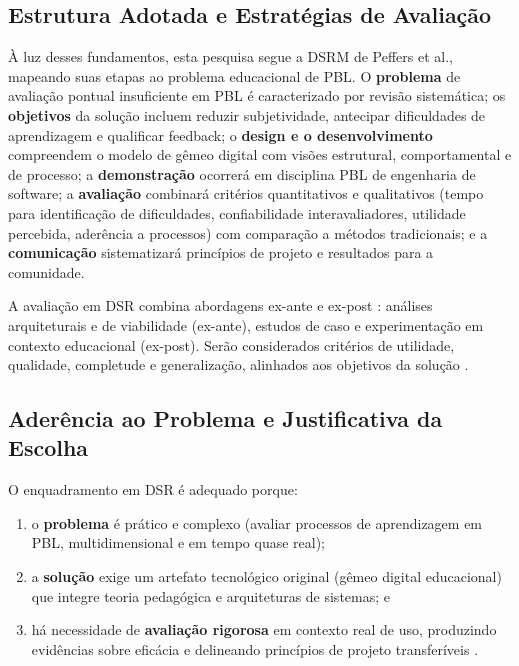 \documentclass[12pt,a4paper]{article}
\begin{document}
\subsection{Estrutura Adotada e Estratégias de Avaliação}

À luz desses fundamentos, esta pesquisa segue a DSRM de Peffers et
al., mapeando suas etapas ao problema educacional de PBL. O \textbf{problema} de
avaliação pontual insuficiente em PBL é caracterizado por revisão sistemática; os
\textbf{objetivos} da solução incluem reduzir subjetividade, antecipar dificuldades de
aprendizagem e qualificar feedback; o \textbf{design e o desenvolvimento} compreendem o
modelo de gêmeo digital com visões estrutural, comportamental e de processo; a
\textbf{demonstração} ocorrerá em disciplina PBL de engenharia de software; a
\textbf{avaliação} combinará critérios quantitativos e qualitativos (tempo para
identificação de dificuldades, confiabilidade interavaliadores, utilidade percebida,
aderência a processos) com comparação a métodos tradicionais; e a \textbf{comunicação}
sistematizará princípios de projeto e resultados para a comunidade.

A avaliação em DSR combina abordagens ex-ante e ex-post \cite{hevner2004design, peffers2007design, wieringa2014design}: análises arquiteturais e de
viabilidade (ex-ante), estudos de caso e experimentação em contexto educacional
(ex-post). Serão considerados critérios de utilidade, qualidade, completude e
generalização, alinhados aos objetivos da solução \cite{gregor2013positioning}.


\subsection{Aderência ao Problema e Justificativa da Escolha}

O enquadramento em DSR é adequado porque:
\begin{enumerate}
  \item o \textbf{problema} é prático e complexo (avaliar processos de aprendizagem em PBL, multidimensional e em tempo quase real);
  \item a \textbf{solução} exige um artefato tecnológico original (gêmeo digital educacional) que integre teoria pedagógica e arquiteturas de sistemas; e
  \item há necessidade de \textbf{avaliação rigorosa} em contexto real de uso, produzindo evidências sobre eficácia e delineando princípios de projeto transferíveis \cite{hevner2004design, gregor2013positioning, wieringa2014design, dresch2015design}.
\end{enumerate}
\end{document}
